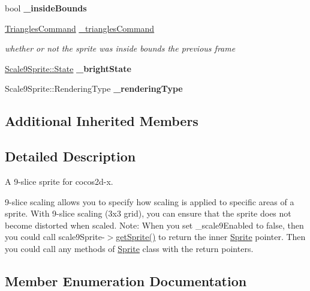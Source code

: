 \begin{DoxyCompactItemize}
bool {\bfseries \+\_\+inside\+Bounds}
\item 
\mbox{\label{classui_1_1Scale9Sprite_a7be79ea462abd68b883612d9e2f8937c}} 
\hyperlink{classTrianglesCommand}{Triangles\+Command} \hyperlink{classui_1_1Scale9Sprite_a7be79ea462abd68b883612d9e2f8937c}{\+\_\+triangles\+Command}
\begin{DoxyCompactList}\small\item\em whether or not the sprite was inside bounds the previous frame \end{DoxyCompactList}\item 
\mbox{\label{classui_1_1Scale9Sprite_a4e03aed69f66d3fa911e2e96637582d4}} 
\hyperlink{classui_1_1Scale9Sprite_a6580c2817c63b7a2461c48378b199d79}{Scale9\+Sprite\+::\+State} {\bfseries \+\_\+bright\+State}
\item 
\mbox{\label{classui_1_1Scale9Sprite_adf22f8198c2ceb5deb5e285c4141903f}} 
Scale9\+Sprite\+::\+Rendering\+Type {\bfseries \+\_\+rendering\+Type}
\end{DoxyCompactItemize}
\subsection*{Additional Inherited Members}


\subsection{Detailed Description}
A 9-\/slice sprite for cocos2d-\/x. 

9-\/slice scaling allows you to specify how scaling is applied to specific areas of a sprite. With 9-\/slice scaling (3x3 grid), you can ensure that the sprite does not become distorted when scaled. Note\+: When you set \+\_\+scale9\+Enabled to false, then you could call {\ttfamily scale9\+Sprite-\/$>$\hyperlink{classui_1_1Scale9Sprite_a22fb324eb7d6b34a3235d0e2dc91ac40}{get\+Sprite()}} to return the inner \hyperlink{classSprite}{Sprite} pointer. Then you could call any methods of \hyperlink{classSprite}{Sprite} class with the return pointers. 

\subsection{Member Enumeration Documentation}
\mbox{\label{classui_1_1Scale9Sprite_a6580c2817c63b7a2461c48378b199d79}} 
